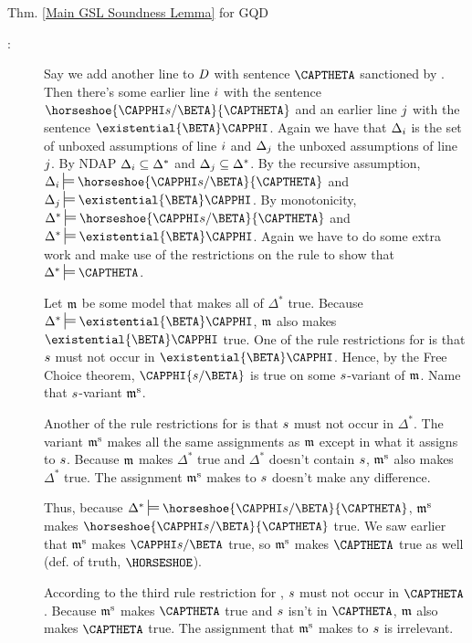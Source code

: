\begin{PROOFOF}{Thm. \ref{Main GSL Soundness Lemma} for GQD}
\begin{description}
\begin{description}
\item[:]
Say we add another line to $\mathit{D}$ with sentence $\CAPTHETA$ sanctioned by .
Then there's some earlier line $i$ with the sentence $\horseshoe{\CAPPHI\variable{s}/\BETA}{\CAPTHETA}$ and an earlier line $j$ with the sentence $\existential{\BETA}\CAPPHI$. 
Again we have that $\Delta_{i}$ is the set of unboxed assumptions of line $i$ and $\Delta_{j}$ the unboxed assumptions of line $j$.
By NDAP $\Delta_{i}\subseteq\Delta^*$ and $\Delta_{j}\subseteq\Delta^*$.
By the recursive assumption, $\Delta_{\integer{i}}\sdtstile{}{}\horseshoe{\CAPPHI\variable{s}/\BETA}{\CAPTHETA}$ and $\Delta_{\integer{j}}\sdtstile{}{}\existential{\BETA}\CAPPHI$.
By monotonicity, $\Delta^*\sdtstile{}{}\horseshoe{\CAPPHI\variable{s}/\BETA}{\CAPTHETA}$ and $\Delta^*\sdtstile{}{}\existential{\BETA}\CAPPHI$.
Again we have to do some extra work and make use of the restrictions on the rule  to show that $\Delta^*\sdtstile{}{}\CAPTHETA$. 

Let $\mathfrak{m}$ be some model that makes all of $\Delta^*$ true. 
Because $\Delta^*\sdtstile{}{}\existential{\BETA}\CAPPHI$, $\mathfrak{m}$ also makes $\existential{\BETA}\CAPPHI$ true.  One of the rule restrictions for  is that $s$ must not occur in $\existential{\BETA}\CAPPHI$.  Hence, by the Free Choice theorem, $\CAPPHI{\variable{s}/\BETA}$ is true on some $s$-variant of $\mathfrak{m}$.  Name that $s$-variant $\mathfrak{m^{\mathrm{s}}_{\mathrm{}}}$.  

Another of the rule restrictions for  is that $s$ must not occur in $\Delta^*$.  The variant $\mathfrak{m^{\mathrm{s}}_{\mathrm{}}}$ makes all the same assignments as $\mathfrak{m}$ except in what it assigns to $s$.  Because $\mathfrak{m}$ makes $\Delta^*$ true and $\Delta^*$ doesn't contain $s$, $\mathfrak{m^{\mathrm{s}}_{\mathrm{}}}$ also makes $\Delta^*$ true.  The assignment $\mathfrak{m^{\mathrm{s}}_{\mathrm{}}}$ makes to $s$ doesn't make any difference.

Thus, because $\Delta^*\sdtstile{}{}\horseshoe{\CAPPHI\variable{s}/\BETA}{\CAPTHETA}$, $\mathfrak{m^{\mathrm{s}}_{\mathrm{}}}$ makes $\horseshoe{\CAPPHI\variable{s}/\BETA}{\CAPTHETA}$ true.  We saw earlier that $\mathfrak{m^{\mathrm{s}}_{\mathrm{}}}$ makes $\CAPPHI\variable{s}/\BETA$ true, so $\mathfrak{m^{\mathrm{s}}_{\mathrm{}}}$ makes $\CAPTHETA$ true as well (def. of truth, $\HORSESHOE$).  

According to the third rule restriction for , $s$ must not occur in $\CAPTHETA$.  Because $\mathfrak{m^{\mathrm{s}}_{\mathrm{}}}$ makes $\CAPTHETA$ true and $s$ isn't in $\CAPTHETA$, $\mathfrak{m}$ also makes $\CAPTHETA$ true.  The assignment that $\mathfrak{m^{\mathrm{s}}_{\mathrm{}}}$ makes to $s$ is irrelevant.


\end{description}
\end{description}
\end{PROOFOF}
